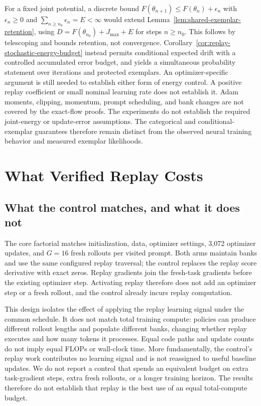 \documentclass{article}
\newcommand{\1}{\mathbf 1}
\theoremstyle{remark}
\theoremstyle{definition}
\theoremstyle{plain}
\begin{document}
For a fixed joint potential, a discrete bound
$F(\theta_{n+1})\le F(\theta_n)+\epsilon_n$ with
$\epsilon_n\ge0$ and $\sum_{n\ge n_0}\epsilon_n=E<\infty$ would extend
Lemma~\ref{lem:shared-exemplar-retention}, using
$D=F(\theta_{n_0})+J_{\max}+E$ for steps $n\ge n_0$.
This follows by telescoping and bounds retention, not convergence. Corollary~\ref{cor:replay-stochastic-energy-budget} instead permits
conditional expected drift with a controlled accumulated error budget,
and yields a simultaneous probability statement over iterations and
protected exemplars. An optimizer-specific argument is still needed to
establish either form of energy control. A positive replay coefficient or small nominal
learning rate does not establish it. Adam moments, clipping, momentum, prompt
scheduling, and bank changes are not covered by the exact-flow proofs.
The experiments do not establish the required joint-energy or update-error
assumptions. The categorical and conditional-exemplar guarantees therefore
remain distinct from the observed neural training behavior and measured
exemplar likelihoods.

\section{What Verified Replay Costs}
\label{app:replay-cost}

\subsection{What the control matches, and what it does not}
\label{app:compute-matching}

The core factorial matches initialization, data, optimizer settings, 3,072
optimizer updates, and $G=16$ fresh rollouts per visited prompt. Both arms
maintain banks and use the same configured replay traversal; the control
replaces the replay score derivative with exact zeros. Replay gradients join
the fresh-task gradients before the existing optimizer step. Activating
replay therefore does not add an optimizer step or a fresh rollout, and the
control already incurs replay computation.

This design isolates the effect of applying the replay learning signal under
the common schedule. It does not match total training compute: policies can
produce different rollout lengths and populate different banks, changing
whether replay executes and how many tokens it processes. Equal code paths
and update counts do not imply equal FLOPs or wall-clock time. More
fundamentally, the control's replay work contributes no learning signal and
is not reassigned to useful baseline updates. We do not report a control
that spends an equivalent budget on extra task-gradient steps, extra fresh
rollouts, or a longer training horizon. The results therefore do not establish
that replay is the best use of an equal total-compute budget.
\end{document}
